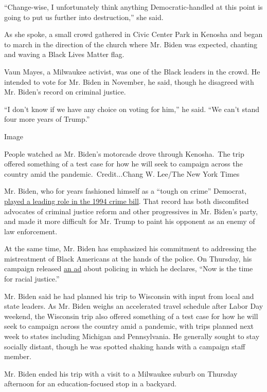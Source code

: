 ``Change-wise, I unfortunately think anything Democratic-handled at this
point is going to put us further into destruction,'' she said.

As she spoke, a small crowd gathered in Civic Center Park in Kenosha and
began to march in the direction of the church where Mr. Biden was
expected, chanting and waving a Black Lives Matter flag.

Vaun Mayes, a Milwaukee activist, was one of the Black leaders in the
crowd. He intended to vote for Mr. Biden in November, he said, though he
disagreed with Mr. Biden's record on criminal justice.

``I don't know if we have any choice on voting for him,'' he said. ``We
can't stand four more years of Trump.''

Image

People watched as Mr. Biden's motorcade drove through Kenosha.~The trip
offered something of a test case for how he will seek to campaign across
the country amid the pandemic.~Credit...Chang W. Lee/The New York Times

Mr. Biden, who for years fashioned himself as a ``tough on crime''
Democrat,
\href{https://www.nytimes3xbfgragh.onion/2019/06/25/us/joe-biden-crime-laws.html}{played
a leading role in the 1994 crime bill}. That record has both discomfited
advocates of criminal justice reform and other progressives in Mr.
Biden's party, and made it more difficult for Mr. Trump to paint his
opponent as an enemy of law enforcement.

At the same time, Mr. Biden has emphasized his commitment to addressing
the mistreatment of Black Americans at the hands of the police. On
Thursday, his campaign released
\href{https://www.youtube.com/watch?v=MHVU3x9iKBs}{an ad} about policing
in which he declares, ``Now is the time for racial justice.''

Mr. Biden said he had planned his trip to Wisconsin with input from
local and state leaders. As Mr. Biden weighs an accelerated travel
schedule after Labor Day weekend, the Wisconsin trip also offered
something of a test case for how he will seek to campaign across the
country amid a pandemic, with trips planned next week to states
including Michigan and Pennsylvania. He generally sought to stay
socially distant, though he was spotted shaking hands with a campaign
staff member.

Mr. Biden ended his trip with a visit to a Milwaukee suburb on Thursday
afternoon for an education-focused stop in a backyard.

